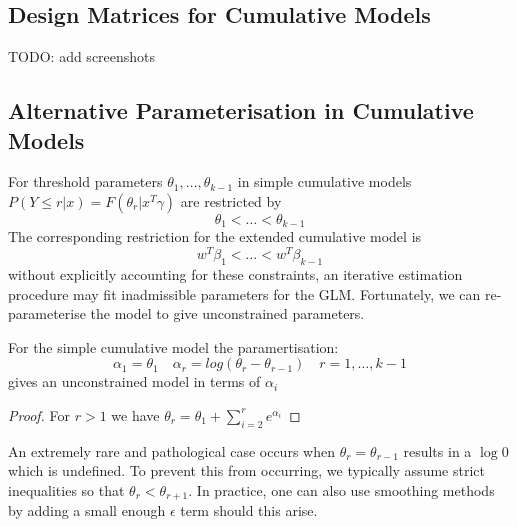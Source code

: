 \subsection{Design Matrices for Cumulative Models}
TODO: add screenshots


\subsection{Alternative Parameterisation in Cumulative Models}
For threshold parameters $\theta_1,\dots,\theta_{k-1}$ in simple cumulative models $P(Y\leq r|x) = F(\theta_r | x^T\gamma)$ are restricted by $$\theta_1<\dots<\theta_{k-1}$$The corresponding restriction for the extended cumulative model is 
$$w^T\beta_1<\dots<w^T\beta_{k-1}$$
without explicitly accounting for these constraints, an iterative estimation procedure may fit inadmissible parameters for the GLM. Fortunately, we can re-parameterise the model to give unconstrained parameters. 

\begin{lemma}
    For the simple cumulative model the paramertisation: 
    $$\alpha_1 = \theta_1 \quad \alpha_r = log(\theta_r - \theta_{r-1}) \quad r =1,\dots,k-1$$
    gives an unconstrained model in terms of $\alpha_i$
\end{lemma}
\begin{proof}
    For $r>1$ we have $\theta_r = \theta_1 + \sum_{i=2}^{r}e^{\alpha_i}$
\end{proof}
\begin{remark}
    An extremely rare and pathological case occurs when $\theta_r = \theta_{r-1}$ results in a $\log0$ which is undefined. To prevent this from occurring, we typically assume strict inequalities so that $\theta_r < \theta_{r+1}$. In practice, one can also use smoothing methods by adding a small enough $\epsilon$ term should this arise.
\end{remark}



